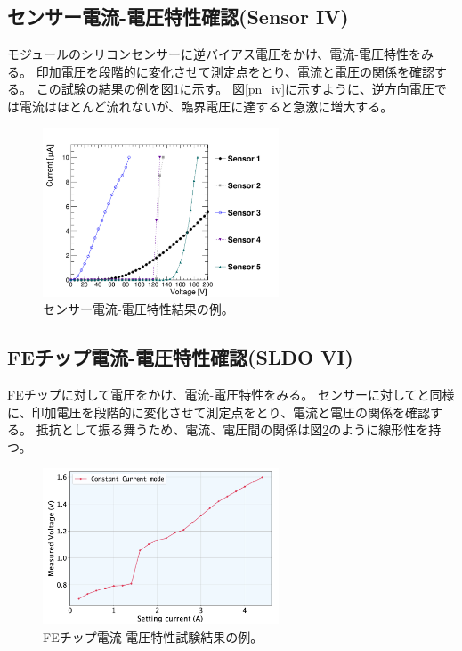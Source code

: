 \subsection{センサー電流-電圧特性確認(Sensor IV)}
モジュールのシリコンセンサーに逆バイアス電圧をかけ、電流-電圧特性をみる。
印加電圧を段階的に変化させて測定点をとり、電流と電圧の関係を確認する。
この試験の結果の例を図\ref{sensor_IV_result}に示す。
図\ref{pn_iv}に示すように、逆方向電圧では電流はほとんど流れないが、臨界電圧に達すると急激に増大する。

\begin{figure}[bpt]\centering
\includegraphics[width=7cm]{sensor_IV_result}
\caption[センサー電流-電圧特性結果の例]{センサー電流-電圧特性結果の例。}
\label{sensor_IV_result}
\end{figure}

\subsection{FEチップ電流-電圧特性確認(SLDO VI)}
FEチップに対して電圧をかけ、電流-電圧特性をみる。
センサーに対してと同様に、印加電圧を段階的に変化させて測定点をとり、電流と電圧の関係を確認する。
抵抗として振る舞うため、電流、電圧間の関係は図\ref{SLDO_VI_result}のように線形性を持つ。

\begin{figure}[bpt]\centering
\includegraphics[width=7cm]{SLDO_VI_result}
\caption[FEチップ電流-電圧特性試験結果の例。]{FEチップ電流-電圧特性試験結果の例。}
\label{SLDO_VI_result}
\end{figure}

